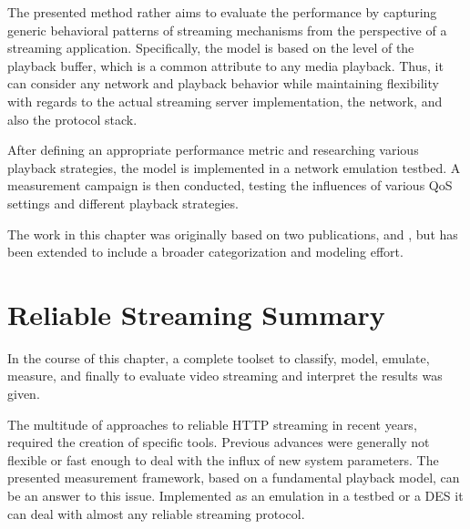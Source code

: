 The presented method rather aims to evaluate the performance by capturing generic behavioral patterns of streaming mechanisms from the perspective of a streaming application. Specifically, the model is based on the level of the playback buffer, which is a common attribute to any media playback. Thus, it can consider any network and playback behavior while maintaining flexibility with regards to the actual streaming server implementation, the network, and also the protocol stack.

After defining an appropriate performance metric and researching various playback strategies, the model is implemented in a network emulation testbed. A measurement campaign is then conducted, testing the influences of various \gls{QoS} settings and different playback strategies. 

The work in this chapter was originally based on two publications, \cite{metzger2011delivery} and \cite{6229739}, but has been extended to include a broader categorization and modeling effort.










\section{Reliable Streaming Summary}
\label{c3:sec:conclusion}

In the course of this chapter, a complete toolset to classify, model, emulate, measure, and finally to evaluate video streaming and interpret the results was given.

The multitude of approaches to reliable \gls{HTTP} streaming in recent years, required the creation of specific tools. Previous advances were generally not flexible or fast enough to deal with the influx of new system parameters. The presented measurement framework, based on a fundamental playback model, can be an answer to this issue. Implemented as an emulation in a testbed or a \gls{DES} it can deal with almost any reliable streaming protocol.

